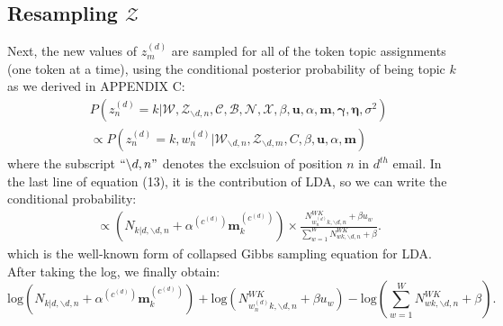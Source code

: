 \documentclass[a4paper]{article}
\begin{document}
 \subsection{Resampling $\mathcal{Z}$}  \label{subsec: Resampling Z}
 Next, the new values of $z^{(d)}_m$ are sampled for all of the token topic assignments (one token at a time), using the conditional posterior probability of being topic $k$ as we derived in APPENDIX C:
 \begin{equation}
 \begin{aligned} & 
 P(z^{(d)}_n=k|\mathcal{W}, \mathcal{Z}_{\backslash d, n},  \mathcal{C}, \mathcal{B}, \mathcal{N}, \mathcal{X}, \beta, \boldsymbol{u}, \alpha, \boldsymbol{m}, \boldsymbol{\gamma}, \boldsymbol{\eta}, \sigma^2)\\
 & \propto P(z^{(d)}_n=k, w^{(d)}_n|\mathcal{W}_{\backslash d, n}, \mathcal{Z}_{\backslash d,m}, C, \beta, \boldsymbol{u}, \alpha, \boldsymbol{m})
 \end{aligned}
 \end{equation}
 where the subscript $``{\backslash d, n}"$ denotes the exclsuion of position $n$ in $d^{th}$ email. In the last line of equation (13), it is the contribution of LDA, so we can write the conditional probability:
 \begin{equation}
 \begin{aligned} 
 & \propto(N_{k|d, \backslash d, n}+\alpha^{(c^{(d)})} \boldsymbol{m}^{(c^{(d)})}_k)\times\frac{N_{w_n^{(d)}k, \backslash d, n}^{WK}+\beta u_w}{\sum_{w=1}^WN_{wk,  \backslash d, n}^{WK}+\beta}.
 \end{aligned}
 \end{equation}
 which is the well-known form of collapsed Gibbs sampling equation for LDA. After taking the log, we finally obtain:
  \begin{equation}
\mbox{log}(N_{k|d, \backslash d, n}+\alpha^{(c^{(d)})} \boldsymbol{m}^{(c^{(d)})}_k)+\mbox{log}(N_{w_n^{(d)}k, \backslash d, n}^{WK}+\beta u_w)-\mbox{log}({\sum_{w=1}^WN_{wk,  \backslash d, n}^{WK}+\beta}).
  \end{equation}
\end{document}
